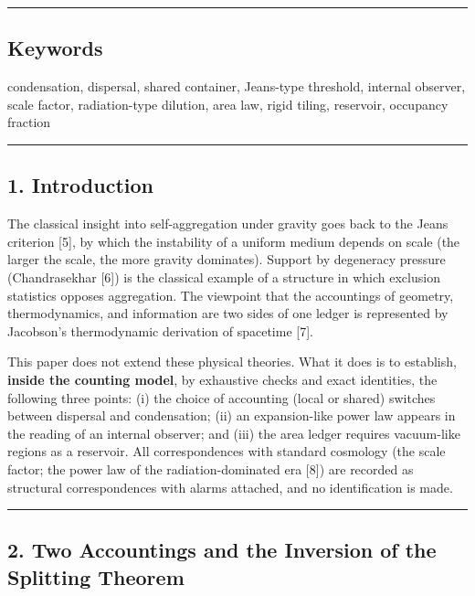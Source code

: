 \documentclass[
]{article}
\begin{document}
\begin{center}\rule{0.5\linewidth}{0.5pt}\end{center}

\subsection{Keywords}\label{keywords}

condensation, dispersal, shared container, Jeans-type threshold,
internal observer, scale factor, radiation-type dilution, area law,
rigid tiling, reservoir, occupancy fraction

\begin{center}\rule{0.5\linewidth}{0.5pt}\end{center}

\subsection{1. Introduction}\label{introduction}

The classical insight into self-aggregation under gravity goes back to
the Jeans criterion {[}5{]}, by which the instability of a uniform
medium depends on scale (the larger the scale, the more gravity
dominates). Support by degeneracy pressure (Chandrasekhar {[}6{]}) is
the classical example of a structure in which exclusion statistics
opposes aggregation. The viewpoint that the accountings of geometry,
thermodynamics, and information are two sides of one ledger is
represented by Jacobson's thermodynamic derivation of spacetime {[}7{]}.

This paper does not extend these physical theories. What it does is to
establish, \textbf{inside the counting model}, by exhaustive checks and
exact identities, the following three points: (i) the choice of
accounting (local or shared) switches between dispersal and
condensation; (ii) an expansion-like power law appears in the reading of
an internal observer; and (iii) the area ledger requires vacuum-like
regions as a reservoir. All correspondences with standard cosmology (the
scale factor; the power law of the radiation-dominated era {[}8{]}) are
recorded as structural correspondences with alarms attached, and no
identification is made.

\begin{center}\rule{0.5\linewidth}{0.5pt}\end{center}

\subsection{2. Two Accountings and the Inversion of the Splitting
Theorem}\label{two-accountings-and-the-inversion-of-the-splitting-theorem}
\end{document}
